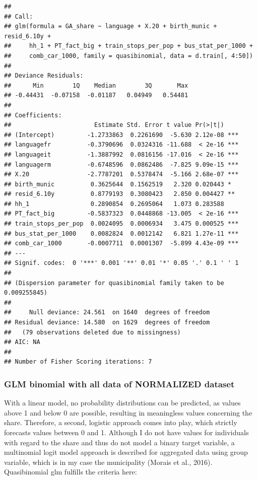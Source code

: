 \documentclass[
]{article}
\begin{document}
\begin{verbatim}
## 
## Call:
## glm(formula = GA_share ~ language + X.20 + birth_munic + resid_6.10y + 
##     hh_1 + PT_fact_big + train_stops_per_pop + bus_stat_per_1000 + 
##     comb_car_1000, family = quasibinomial, data = d.train[, 4:50])
## 
## Deviance Residuals: 
##      Min        1Q    Median        3Q       Max  
## -0.44431  -0.07158  -0.01187   0.04949   0.54481  
## 
## Coefficients:
##                       Estimate Std. Error t value Pr(>|t|)    
## (Intercept)         -1.2733863  0.2261690  -5.630 2.12e-08 ***
## languagefr          -0.3790696  0.0324316 -11.688  < 2e-16 ***
## languageit          -1.3887992  0.0816156 -17.016  < 2e-16 ***
## languagerm          -0.6748596  0.0862486  -7.825 9.09e-15 ***
## X.20                -2.7787201  0.5378474  -5.166 2.68e-07 ***
## birth_munic          0.3625644  0.1562519   2.320 0.020443 *  
## resid_6.10y          0.8779193  0.3080423   2.850 0.004427 ** 
## hh_1                 0.2890854  0.2695064   1.073 0.283588    
## PT_fact_big         -0.5837323  0.0448868 -13.005  < 2e-16 ***
## train_stops_per_pop  0.0024095  0.0006934   3.475 0.000525 ***
## bus_stat_per_1000    0.0082824  0.0012142   6.821 1.27e-11 ***
## comb_car_1000       -0.0007711  0.0001307  -5.899 4.43e-09 ***
## ---
## Signif. codes:  0 '***' 0.001 '**' 0.01 '*' 0.05 '.' 0.1 ' ' 1
## 
## (Dispersion parameter for quasibinomial family taken to be 0.009255845)
## 
##     Null deviance: 24.561  on 1640  degrees of freedom
## Residual deviance: 14.580  on 1629  degrees of freedom
##   (79 observations deleted due to missingness)
## AIC: NA
## 
## Number of Fisher Scoring iterations: 7
\end{verbatim}

\hypertarget{glm-binomial-with-all-data-of-normalized-dataset}{%
\subsubsection{GLM binomial with all data of NORMALIZED
dataset}\label{glm-binomial-with-all-data-of-normalized-dataset}}

With a linear model, no probability distributions can be predicted, as
values above 1 and below 0 are possible, resulting in meaningless values
concerning the share. Therefore, a second, logistic approach comes into
play, which strictly forecasts values between 0 and 1. Although I do not
have values for individuals with regard to the share and thus do not
model a binary target variable, a multinomial logit model approach is
described for aggregated data using group variable, which is in my case
the municipality (Morais et al., 2016). Quasibinomial glm fulfills the
criteria here:
\end{document}
